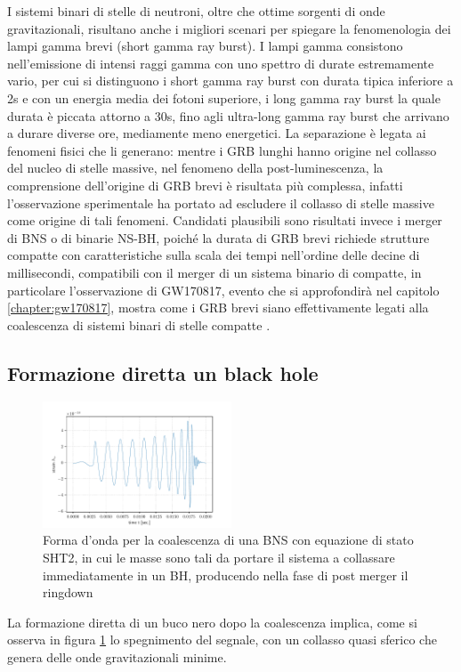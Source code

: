 I sistemi binari di stelle di neutroni, oltre che ottime sorgenti di onde gravitazionali, risultano anche i migliori scenari per spiegare la fenomenologia dei lampi gamma brevi (short gamma ray burst). I lampi gamma consistono nell'emissione di intensi raggi gamma con uno spettro di durate estremamente vario, per cui si distinguono i short gamma ray burst con durata tipica inferiore a 2s e con un energia media dei fotoni superiore, i long gamma ray burst la quale durata è piccata attorno a 30s, fino agli ultra-long gamma ray burst che arrivano a durare diverse ore, mediamente meno energetici. 
La separazione è legata ai fenomeni fisici che li generano: mentre i GRB lunghi hanno origine nel collasso del nucleo di stelle massive, nel fenomeno della post-luminescenza, la comprensione dell'origine di GRB brevi è risultata più complessa, infatti l'osservazione sperimentale ha portato ad escludere il collasso di stelle massive come origine di tali fenomeni. Candidati plausibili sono risultati invece i merger di BNS o di binarie NS-BH, poiché la durata di GRB brevi richiede strutture compatte con caratteristiche sulla scala dei tempi nell'ordine delle decine di millisecondi, compatibili con il merger di un sistema binario di compatte, in particolare l'osservazione di GW170817, evento che si approfondirà nel capitolo \ref{chapter:gw170817}, mostra come i GRB brevi siano effettivamente legati alla coalescenza di sistemi binari di stelle compatte \cite{maggiore2018gravitational}.

\subsection{Formazione diretta un black hole}	
\label{subsection:Diretto_Black_hole}

\begin{figure}
	\vspace{-15pt}
	\begin{center}
		\includegraphics[width=0.5\textwidth]{figures/Capitolo_1/SHT2.2.pdf}
	\end{center}
	\vspace{-10pt}
	\caption{Forma d'onda per la coalescenza di una BNS con equazione di stato SHT2, in cui le masse sono tali da portare il sistema a collassare immediatamente in un BH, producendo nella fase di post merger il ringdown}
	\label{fig:FormaOndaBH}
	\vspace{-50pt}
\end{figure}
La formazione diretta di un buco nero dopo la coalescenza implica, come si osserva in figura \ref{fig:FormaOndaBH} lo spegnimento del segnale, con un collasso quasi sferico che genera delle onde gravitazionali minime\cite{sarin2020evolution}.

